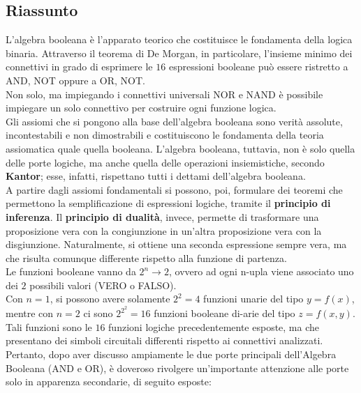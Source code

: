 \documentclass[a4paper]{extarticle}
\begin{document}
\subsection{Riassunto}
L'algebra booleana è l'apparato teorico che costituisce le fondamenta della logica binaria. Attraverso il teorema di De Morgan, in particolare, l'insieme minimo dei connettivi in grado di esprimere le \(16\) espressioni booleane può essere ristretto a AND, NOT oppure a OR, NOT.\\
Non solo, ma impiegando i connettivi universali NOR e NAND è possibile impiegare un solo connettivo per costruire ogni funzione logica.\\
Gli assiomi che si pongono alla base dell'algebra booleana sono verità assolute, incontestabili e non dimostrabili e costituiscono le fondamenta della teoria assiomatica quale quella booleana. L'algebra booleana, tuttavia, non è solo quella delle porte logiche, ma anche quella delle operazioni insiemistiche, secondo \textbf{Kantor}; esse, infatti, rispettano tutti i dettami dell'algebra booleana.\\
A partire dagli assiomi fondamentali si possono, poi, formulare dei teoremi che permettono la semplificazione di espressioni logiche, tramite il \textbf{principio di inferenza}. Il \textbf{principio di dualità}, invece, permette di trasformare una proposizione vera con la congiunzione in un'altra proposizione vera con la disgiunzione. Naturalmente, si ottiene una seconda espressione sempre vera, ma che risulta comunque differente rispetto alla funzione di partenza.\\
Le funzioni booleane vanno da \(2^n \rightarrow 2\), ovvero ad ogni n-upla viene associato uno dei \(2\) possibili valori (VERO o FALSO).\\
Con \(n = 1\), si possono avere solamente \(2^2 = 4\) funzioni unarie del tipo \(y = f(x)\), mentre con \(n = 2\) ci sono \(2^{2^2} = 16\) funzioni booleane di-arie del tipo \(z = f(x, y)\). Tali funzioni sono le \(16\) funzioni logiche precedentemente esposte, ma che presentano dei simboli circuitali differenti rispetto ai connettivi analizzati.\\
Pertanto, dopo aver discusso ampiamente le due porte principali dell'Algebra Booleana (AND e OR), è doveroso rivolgere un'importante attenzione alle porte solo in apparenza secondarie, di seguito esposte:
\end{document}

